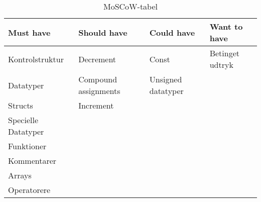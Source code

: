 %
%
\begin{table}[H]
\centering
\begin{tabular}{l|l|l|l}
\toprule
\textbf{Must have} & \textbf{Should have} & \textbf{Could have} & \textbf{Want to have} \\ \midrule
Kontrolstruktur & Decrement & Const & Betinget udtryk   \\ 
Datatyper & Compound assignments & Unsigned datatyper  & \\ 
Structs & Increment &  &	   \\ 
Specielle Datatyper	&  &  &		   \\ 
Funktioner &  &  & 		   \\ 
Kommentarer &  &  & 		   \\ 
Arrays &  &  & 	   \\ 
Operatorere &  &  & 		   \\ \bottomrule
 
 
 
 

\end{tabular}
\caption{MoSCoW-tabel}
\label{tab:moscow}
\end{table}

